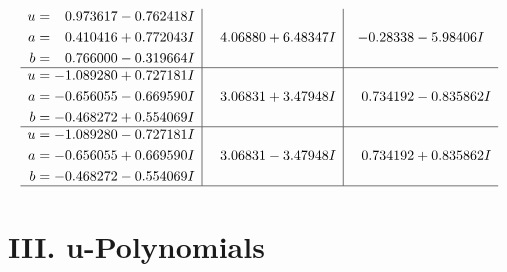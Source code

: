 \documentclass[1p]{elsarticle_modified}
\theoremstyle{definition}
\begin{document}
$$\begin{array}{c|c|c}
\begin{aligned}
u &= \phantom{-}0.973617 - 0.762418 I \\
a &= \phantom{-}0.410416 + 0.772043 I \\
b &= \phantom{-}0.766000 - 0.319664 I\end{aligned}
 & \phantom{-}4.06880 + 6.48347 I & -0.28338 - 5.98406 I \\ \hline\begin{aligned}
u &= -1.089280 + 0.727181 I \\
a &= -0.656055 - 0.669590 I \\
b &= -0.468272 + 0.554069 I\end{aligned}
 & \phantom{-}3.06831 + 3.47948 I & \phantom{-}0.734192 - 0.835862 I \\ \hline\begin{aligned}
u &= -1.089280 - 0.727181 I \\
a &= -0.656055 + 0.669590 I \\
b &= -0.468272 - 0.554069 I\end{aligned}
 & \phantom{-}3.06831 - 3.47948 I & \phantom{-}0.734192 + 0.835862 I\\
 \hline 
 \end{array}$$\newpage
\newpage\renewcommand{\arraystretch}{1}
\centering \section*{ III. u-Polynomials}
\end{document}
